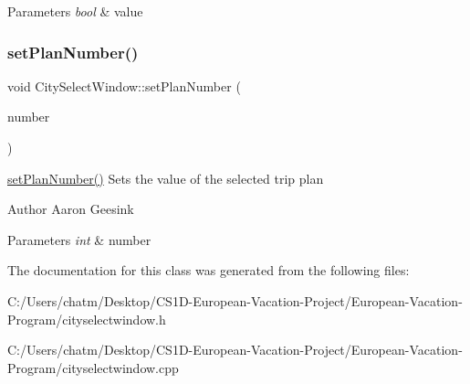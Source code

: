 \begin{DoxyParams}{Parameters}
{\em bool} & value \\
\hline
\end{DoxyParams}
\mbox{\label{class_city_select_window_a6afffce8400f9541a3c31e0e359c0d9b}} 
\subsubsection{\texorpdfstring{setPlanNumber()}{setPlanNumber()}}
{\footnotesize\ttfamily void City\+Select\+Window\+::set\+Plan\+Number (\begin{DoxyParamCaption}\item[{int}]{number }\end{DoxyParamCaption})}



\mbox{\hyperlink{class_city_select_window_a6afffce8400f9541a3c31e0e359c0d9b}{set\+Plan\+Number()}} Sets the value of the selected trip plan 

\begin{DoxyAuthor}{Author}
Aaron Geesink 
\end{DoxyAuthor}

\begin{DoxyParams}{Parameters}
{\em int} & number \\
\hline
\end{DoxyParams}


The documentation for this class was generated from the following files\+:\begin{DoxyCompactItemize}
\item 
C\+:/\+Users/chatm/\+Desktop/\+C\+S1\+D-\/\+European-\/\+Vacation-\/\+Project/\+European-\/\+Vacation-\/\+Program/cityselectwindow.\+h\item 
C\+:/\+Users/chatm/\+Desktop/\+C\+S1\+D-\/\+European-\/\+Vacation-\/\+Project/\+European-\/\+Vacation-\/\+Program/cityselectwindow.\+cpp\end{DoxyCompactItemize}
